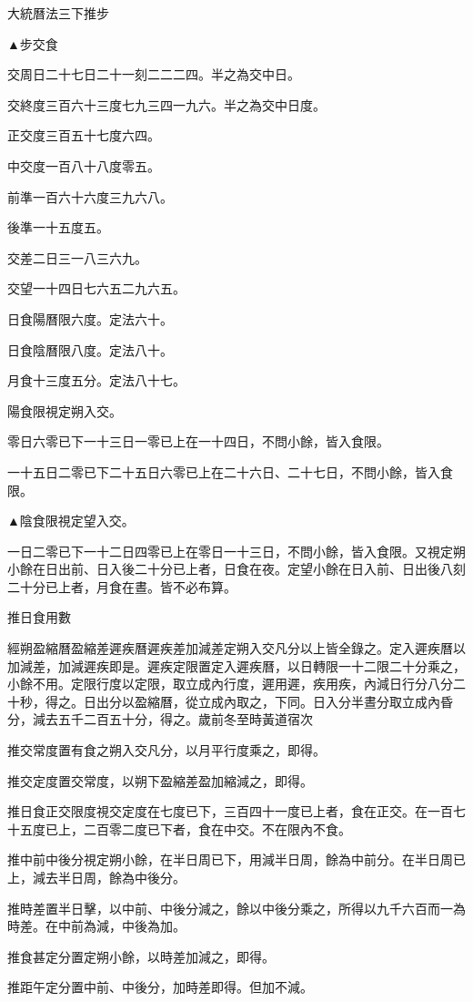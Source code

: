 大統曆法三下推步

▲步交食

交周日二十七日二十一刻二二二四。半之為交中日。

交終度三百六十三度七九三四一九六。半之為交中日度。

正交度三百五十七度六四。

中交度一百八十八度零五。

前準一百六十六度三九六八。

後準一十五度五。

交差二日三一八三六九。

交望一十四日七六五二九六五。

日食陽曆限六度。定法六十。

日食陰曆限八度。定法八十。

月食十三度五分。定法八十七。

陽食限視定朔入交。

零日六零已下一十三日一零已上在一十四日，不問小餘，皆入食限。

一十五日二零已下二十五日六零已上在二十六日、二十七日，不問小餘，皆入食限。

▲陰食限視定望入交。

一日二零已下一十二日四零已上在零日一十三日，不問小餘，皆入食限。又視定朔小餘在日出前、日入後二十分已上者，日食在夜。定望小餘在日入前、日出後八刻二十分已上者，月食在晝。皆不必布算。

推日食用數

經朔盈縮曆盈縮差遲疾曆遲疾差加減差定朔入交凡分以上皆全錄之。定入遲疾曆以加減差，加減遲疾即是。遲疾定限置定入遲疾曆，以日轉限一十二限二十分乘之，小餘不用。定限行度以定限，取立成內行度，遲用遲，疾用疾，內減日行分八分二十秒，得之。日出分以盈縮曆，從立成內取之，下同。日入分半晝分取立成內昏分，減去五千二百五十分，得之。歲前冬至時黃道宿次

推交常度置有食之朔入交凡分，以月平行度乘之，即得。

推交定度置交常度，以朔下盈縮差盈加縮減之，即得。

推日食正交限度視交定度在七度已下，三百四十一度已上者，食在正交。在一百七十五度已上，二百零二度已下者，食在中交。不在限內不食。

推中前中後分視定朔小餘，在半日周已下，用減半日周，餘為中前分。在半日周已上，減去半日周，餘為中後分。

推時差置半日擊，以中前、中後分減之，餘以中後分乘之，所得以九千六百而一為時差。在中前為減，中後為加。

推食甚定分置定朔小餘，以時差加減之，即得。

推距午定分置中前、中後分，加時差即得。但加不減。

